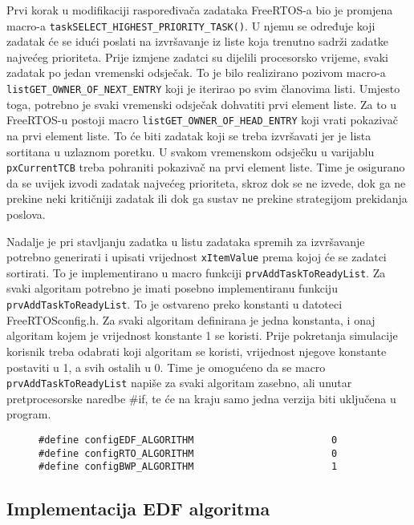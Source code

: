 \documentclass[../zavrsni.tex]{subfiles}
\begin{document}
Prvi korak u modifikaciji raspoređivača zadataka FreeRTOS-a bio je promjena macro-a \texttt{taskSELECT\_HIGHEST\_PRIORITY\_TASK()}.
U njemu se određuje koji zadatak će se idući poslati na izvršavanje iz liste koja trenutno sadrži zadatke najvećeg prioriteta.
Prije izmjene zadatci su dijelili procesorsko vrijeme, svaki zadatak po jedan vremenski odsječak. To je bilo realizirano pozivom
macro-a \texttt{listGET\_OWNER\_OF\_NEXT\_ENTRY} koji je iterirao po svim članovima listi. Umjesto toga, potrebno je svaki vremenski odsječak
dohvatiti prvi element liste. Za to u FreeRTOS-u postoji macro \texttt{listGET\_OWNER\_OF\_HEAD\_ENTRY} koji vrati pokazivač na 
prvi element liste. To će biti zadatak koji se treba izvršavati jer je lista sortitana u uzlaznom poretku. 
U svakom vremenskom odsječku u varijablu \texttt{pxCurrentTCB} treba pohraniti pokazivač na prvi element liste. Time je osigurano da
se uvijek izvodi zadatak najvećeg prioriteta, skroz dok se ne izvede, dok ga ne prekine neki kritičniji zadatak ili dok ga sustav 
ne prekine strategijom prekidanja poslova.

Nadalje je pri stavljanju zadatka u listu zadataka spremih za izvršavanje potrebno generirati i upisati vrijednost \texttt{xItemValue}
prema kojoj će se zadatci sortirati. To je implementirano u macro funkciji \texttt{prvAddTaskToReadyList}. Za svaki algoritam 
potrebno je imati posebno implementiranu funkciju \texttt{prvAddTaskToReadyList}. To je ostvareno preko konstanti u datoteci 
FreeRTOSconfig.h. Za svaki algoritam definirana je jedna konstanta, i onaj algoritam kojem je vrijednost konstante 1 se koristi.
Prije pokretanja simulacije korisnik treba odabrati koji algoritam se koristi, vrijednost njegove konstante postaviti u 1, a svih 
ostalih u 0. Time je omogućeno da se macro \texttt{prvAddTaskToReadyList} napiše za svaki algoritam zasebno, ali unutar pretprocesorske
naredbe \#if, te će na kraju samo jedna verzija biti uključena u program.

\begin{figure}[h]
\centering
\begin{lstlisting}[style=CStyle,caption={Primjer uključenja algoritma BWP},captionpos=b]
#define configEDF_ALGORITHM                        0
#define configRTO_ALGORITHM                        0
#define configBWP_ALGORITHM                        1
\end{lstlisting}
\end{figure}

\subsection{Implementacija EDF algoritma}
\end{document}
